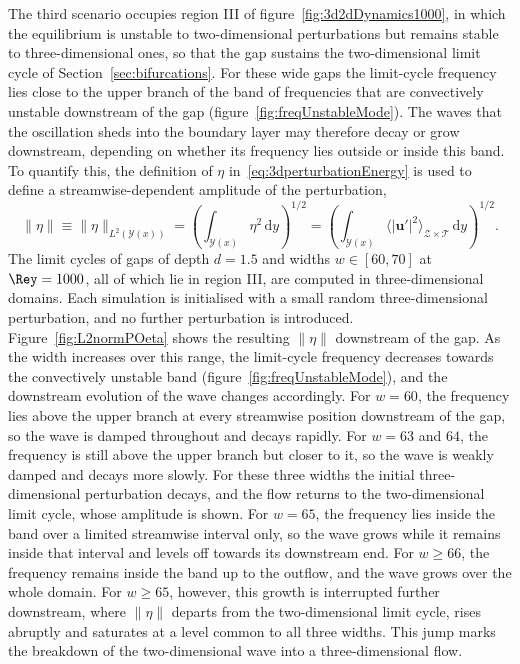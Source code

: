 \documentclass[lineno]{jfm}
\begin{document}
The third scenario occupies region III of figure~\ref{fig:3d2dDynamics1000}, in which the equilibrium is unstable to two-dimensional perturbations but remains stable to three-dimensional ones, so that the gap sustains the two-dimensional limit cycle of Section~\ref{sec:bifurcations}. For these wide gaps the limit-cycle frequency lies close to the upper branch of the band of frequencies that are convectively unstable downstream of the gap (figure~\ref{fig:freqUnstableMode}). The waves that the oscillation sheds into the boundary layer may therefore decay or grow downstream, depending on whether its frequency lies outside or inside this band. To quantify this, the definition of $\eta$ in~\eqref{eq:3dperturbationEnergy} is used to define a streamwise-dependent amplitude of the perturbation,
\begin{equation}\label{eq:amplitudeNorm3D}
	\|\eta\|\equiv\|\eta\|_{L^2(\mathcal{Y}(x))} = {\left( \int_{\mathcal{Y}(x)} {\eta^2} \,\mathrm{d}y \right)}^{1/2} = {\left( \int_{\mathcal{Y}(x)} {\langle |\boldsymbol{u}'|^2\rangle}_{\mathcal{Z}\times\mathcal{T}}\, \mathrm{d}y \right)}^{1/2}.
\end{equation}
The limit cycles of gaps of depth $d=1.5$ and widths $w\in[60,70]$ at $\Rey=1000$, all of which lie in region III, are computed in three-dimensional domains. Each simulation is initialised with a small random three-dimensional perturbation, and no further perturbation is introduced. Figure~\ref{fig:L2normPOeta} shows the resulting $\|\eta\|$ downstream of the gap. As the width increases over this range, the limit-cycle frequency decreases towards the convectively unstable band (figure~\ref{fig:freqUnstableMode}), and the downstream evolution of the wave changes accordingly. For $w=60$, the frequency lies above the upper branch at every streamwise position downstream of the gap, so the wave is damped throughout and decays rapidly. For $w=63$ and $64$, the frequency is still above the upper branch but closer to it, so the wave is weakly damped and decays more slowly. For these three widths the initial three-dimensional perturbation decays, and the flow returns to the two-dimensional limit cycle, whose amplitude is shown. For $w=65$, the frequency lies inside the band over a limited streamwise interval only, so the wave grows while it remains inside that interval and levels off towards its downstream end. For $w\geq66$, the frequency remains inside the band up to the outflow, and the wave grows over the whole domain. For $w\geq65$, however, this growth is interrupted further downstream, where $\|\eta\|$ departs from the two-dimensional limit cycle, rises abruptly and saturates at a level common to all three widths. This jump marks the breakdown of the two-dimensional wave into a three-dimensional flow.
\end{document}
